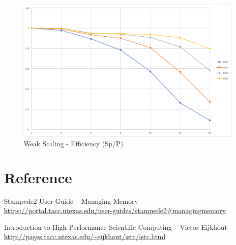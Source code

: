 \documentclass[12pt]{article} %
\begin{document}
\begin{figure}[htb]
\caption{Weak Scaling - Efficiency (Sp/P)}\label{fig:benchmark02}
\centering
\includegraphics[width=\textwidth,keepaspectratio]{imgs/img04.png}
\end{figure}



\section{Reference}

\begin{flushleft}
Stampede2 User Guide -- Managing Memory \\ \url{https://portal.tacc.utexas.edu/user-guides/stampede2#managingmemory}

Introduction to High Performance Scientific Computing -- Victor Eijkhout \\ \url{http://pages.tacc.utexas.edu/~eijkhout/istc/istc.html}
\end{flushleft}

\newpage


\begin{table}[]
\centering
\caption{Strong Scaling Benchmark - Number of Particles: 1000}
\end{table}
\end{document}
